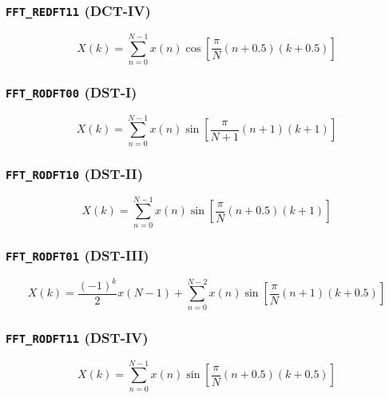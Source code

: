 \subsubsection{{\tt FFT\_REDFT11} (DCT-IV)}
\label{module:fft:r2r:REDFT11}
    \begin{equation}
    \label{eqn:fft:dct-IV}
        X(k) =  \sum_{n=0}^{N-1}{
                    x(n) \cos\left[
                        \frac{\pi}{N}
                        \left(n+0.5\right)
                        \left(k+0.5\right)
                    \right]
                }
    \end{equation}

\subsubsection{{\tt FFT\_RODFT00} (DST-I)}
\label{module:fft:r2r:RODFT00}
    \begin{equation}
    \label{eqn:fft:dst-I}
        X(k) =  \sum_{n=0}^{N-1}{
                    x(n) \sin\left[
                        \frac{\pi}{N+1}(n+1)(k+1)
                    \right]
                }
    \end{equation}

\subsubsection{{\tt FFT\_RODFT10} (DST-II)}
\label{module:fft:r2r:RODFT10}
    \begin{equation}
    \label{eqn:fft:dst-II}
        X(k) =  \sum_{n=0}^{N-1}{
                    x(n) \sin\left[
                        \frac{\pi}{N}(n+0.5)(k+1)
                    \right]
                }
    \end{equation}

\subsubsection{{\tt FFT\_RODFT01} (DST-III)}
\label{module:fft:r2r:RODFT01}
    \begin{equation}
    \label{eqn:fft:dst-III}
        X(k) =  \frac{(-1)^k}{2}x(N-1) + 
                \sum_{n=0}^{N-2}{
                    x(n) \sin\left[
                        \frac{\pi}{N}(n+1)(k+0.5)
                    \right]
                }
    \end{equation}

\subsubsection{{\tt FFT\_RODFT11} (DST-IV)}
\label{module:fft:r2r:RODFT11}
    \begin{equation}
    \label{eqn:fft:dst-IV}
        X(k) =  \sum_{n=0}^{N-1}{
                    x(n) \sin\left[
                        \frac{\pi}{N}(n+0.5)(k+0.5)
                    \right]
                }
    \end{equation}

